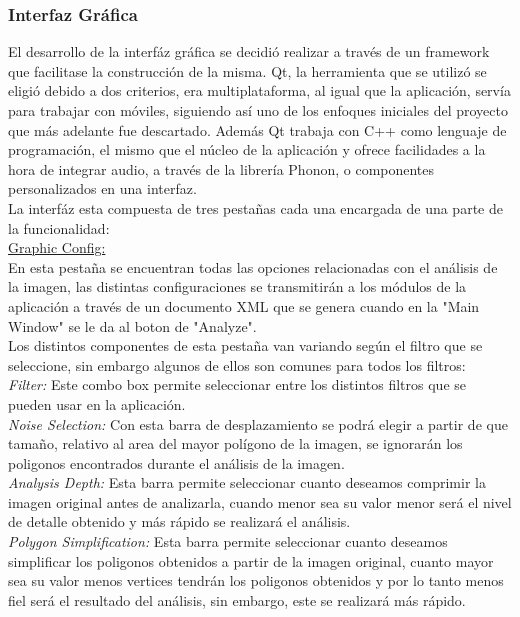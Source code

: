 \subsubsection{Interfaz Gráfica}

El desarrollo de la interfáz gráfica se decidió realizar a través de un framework que facilitase la construcción de la misma. Qt, la herramienta que se utilizó se eligió debido a dos criterios, era multiplataforma, al igual que la aplicación, servía para trabajar con móviles, siguiendo así uno de los enfoques iniciales del proyecto que más adelante fue descartado. Además Qt trabaja con C++ como lenguaje de programación, el mismo que el núcleo de la aplicación y ofrece facilidades a la hora de integrar audio, a través de la librería Phonon, o componentes personalizados en una interfaz.\\
\newline
La interfáz esta compuesta de tres pestañas cada una encargada de una parte de la funcionalidad:
\newline
\\\underline{Graphic Config:}
\\En esta pestaña se encuentran todas las opciones relacionadas con el análisis de la imagen, las distintas configuraciones se transmitirán a los módulos de la aplicación a través de un documento XML que se genera cuando en la "Main Window" se le da al boton de "Analyze".
\\Los distintos componentes de esta pestaña van variando según el filtro que se seleccione, sin embargo algunos de ellos son comunes para todos los filtros:
\newline
\\\textit{Filter:} Este combo box permite seleccionar entre los distintos filtros que se pueden usar en la aplicación.
\\\textit{Noise Selection:} Con esta barra de desplazamiento se podrá elegir a partir de que tamaño, relativo al area del mayor polígono de la imagen, se ignorarán los poligonos encontrados durante el análisis de la imagen.
\\\textit{Analysis Depth:} Esta barra permite seleccionar cuanto deseamos comprimir la imagen original antes de analizarla, cuando menor sea su valor menor será el nivel de detalle obtenido y más rápido se realizará el análisis.
\\\textit{Polygon Simplification:} Esta barra permite seleccionar cuanto deseamos simplificar los poligonos obtenidos a partir de la imagen original, cuanto mayor sea su valor menos vertices tendrán los poligonos obtenidos y por lo tanto menos fiel será el resultado del análisis, sin embargo, este se realizará más rápido.
